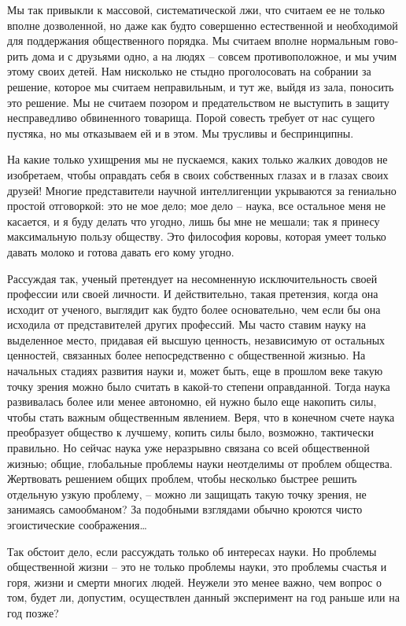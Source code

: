 \documentclass{book}
\begin{document}
Мы так привыкли к массовой, систематической лжи, что считаем ее не только вполне дозволенной, но даже как будто совершенно естественной и необходимой для поддержания общественного порядка. Мы считаем вполне нормальным гово­рить дома и с друзьями одно, а на людях -- совсем противопо­ложное, и мы учим этому своих детей. Нам нисколько не стыд­но проголосовать на собрании за решение, которое мы счита­ем неправильным, и тут же, выйдя из зала, поносить это реше­ние. Мы не считаем позором и предательством не выступить в защиту несправедливо обвиненного товарища. Порой совесть требует от нас сущего пустяка, но мы отказываем ей и в этом. Мы трусливы и беспринципны.

На какие только ухищрения мы не пускаемся, каких только жалких доводов не изобретаем, чтобы оправдать себя в своих собственных глазах и в глазах своих друзей! Многие представители научной интеллигенции укрываются за гениально простой отговоркой: это не мое дело; мое дело -- наука, все остальное меня не касается, и я буду делать что угодно, лишь бы мне не мешали; так я принесу максималь­ную пользу обществу. Это философия коровы, которая умеет только давать молоко и готова давать его кому угодно.

Рассуждая так, ученый претендует на несомненную исключительность своей профессии или своей личности. И действительно, такая 
претензия, когда она исходит от ученого, вы­глядит как будто более основательно, чем если бы она исхо­дила от представителей 
других профессий. Мы часто ставим науку на выделенное место, придавая ей высшую ценность, независимую от остальных ценностей, 
связанных более непо­средственно с общественной жизнью. На начальных стадиях развития науки и, может быть, еще в прошлом веке 
такую точку зрения можно было считать в какой-то степени оправ­данной. Тогда наука развивалась более или менее автономно, ей 
нужно было еще накопить силы, чтобы стать важным общест­венным явлением. Веря, что в конечном счете наука преобра­зует общество к 
лучшему, копить силы было, возможно, такти­чески правильно. Но сейчас наука уже неразрывно связана со всей общественной жизнью; 
общие, глобальные проблемы науки неотделимы от проблем общества. Жертвовать решением общих проблем, чтобы несколько быстрее 
решить отдельную узкую проблему, -- можно ли защищать такую точку зрения, не занимаясь самообманом? За подобными взглядами 
обычно кроются чисто эгоистические соображения\ldots

Так обстоит дело, если рассуждать только об интересах науки. Но проблемы общественной жизни -- это не только проблемы науки, это проблемы счастья и горя, жизни и смерти многих людей. Неужели это менее важно, чем вопрос о том, будет ли, допустим, осуществлен данный эксперимент на год раньше или на год позже?
\end{document}
